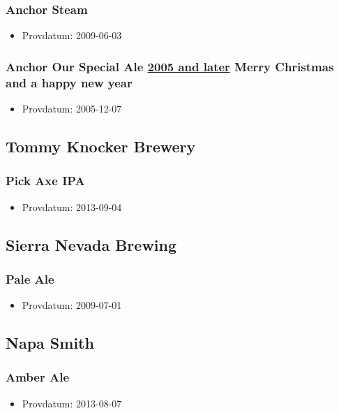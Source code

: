 \documentclass[11pt]{article}
\begin{document}
\subsubsection{Anchor Steam}
\label{sec:orgfc43954}
\begin{itemize}
\item Provdatum: 2009-06-03
\end{itemize}
\subsubsection{Anchor Our Special Ale \underline{2005 and later} Merry Christmas and a happy new year}
\label{sec:org29eaeba}
\begin{itemize}
\item Provdatum: 2005-12-07
\end{itemize}
\subsection{Tommy Knocker Brewery}
\label{sec:org6b85680}
\subsubsection{Pick Axe IPA}
\label{sec:org0789cf9}
\begin{itemize}
\item Provdatum: 2013-09-04
\end{itemize}
\subsection{Sierra Nevada Brewing}
\label{sec:org3185cc4}
\subsubsection{Pale Ale}
\label{sec:orgf57c53b}
\begin{itemize}
\item Provdatum: 2009-07-01
\end{itemize}
\subsection{Napa Smith}
\label{sec:org6b2c618}
\subsubsection{Amber Ale}
\label{sec:orgba712e2}
\begin{itemize}
\item Provdatum: 2013-08-07
\end{itemize}
\end{document}
